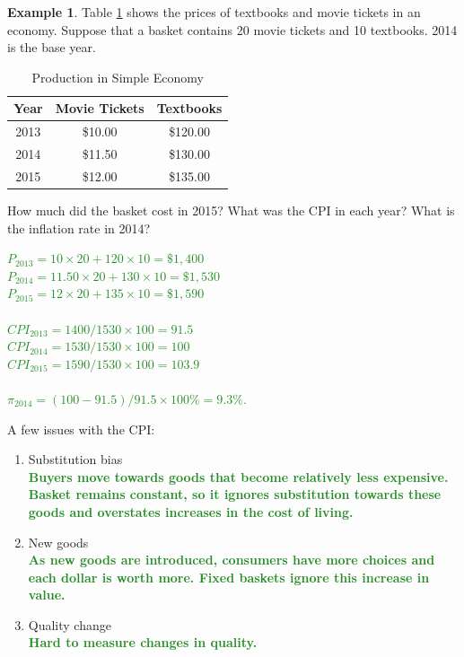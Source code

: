 \documentclass[11pt]{article}\usepackage[]{graphicx}\usepackage[]{color}
\theoremstyle{definition}
\newtheorem{exmp}{Example}[section]
\newcommand{\blank}[1]{}
\newcommand{\ddp}[1]{{\textbf{\textcolor{ForestGreen}{#1}}}}
\begin{document}
\begin{exmp} Table \ref{cpi} shows the prices of textbooks and movie tickets in an economy. Suppose that a basket contains 20 movie tickets and 10 textbooks. 2014 is the base year.

\begin{table}[ht]
	\centering
	\caption{Production in Simple Economy}
	\label{cpi}
	\begin{tabular}{ c|c|c}       
		
		Year & Movie Tickets & Textbooks  \\
		\hline
		2013 & \$10.00 & \$120.00 \\
		2014 & \$11.50 & \$130.00 \\
		2015 & \$12.00 & \$135.00 \\
	\end{tabular}
\end{table} 
How much did the basket cost in 2015? What was the CPI in each year? What is the inflation rate in 2014?
\end{exmp}
\ddp{$P_{2013} = 10 \times 20 + 120 \times 10 = \$1,400$ \\
	$P_{2014} = 11.50 \times 20 + 130 \times 10 = \$1,530$ \\
	$P_{2015} = 12 \times 20 + 135 \times 10 = \$1,590$ \\ \\
	$CPI_{2013} = 1400/1530 \times 100 = 91.5$ \\ 
	$CPI_{2014} = 1530/1530 \times 100 = 100$ \\
	$CPI_{2015} = 1590/1530 \times 100 = 103.9$ \\\\
	$\pi_{2014} = (100-91.5)/91.5\times 100\% = 9.3\%.$}
\blank{}
\blank{}
\blank{}
\blank{}
\blank{}
\blank{}
\blank{}

A few issues with the CPI:
\begin{enumerate}
	\setlength{\itemsep}{1em}
	\item Substitution bias \ddp{\\Buyers move towards goods that become relatively less expensive. Basket remains constant, so it ignores substitution towards these goods and overstates increases in the cost of living.}
	\item New goods \ddp{\\As new goods are introduced, consumers have more choices and each dollar is worth more. Fixed baskets ignore this increase in value.}
	\item Quality change \ddp{\\Hard to measure changes in quality.}
\end{enumerate}
\end{document}
